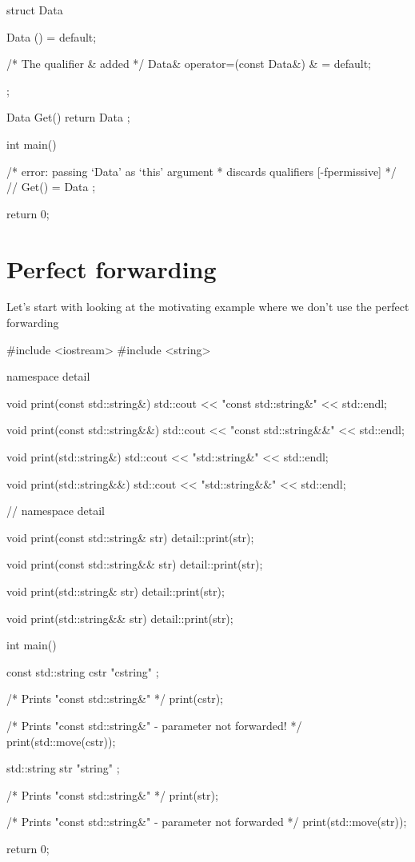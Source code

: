 \documentclass[../main]{subfiles}
\begin{document}
\begin{Code}
struct Data
{
    Data () = default;
    
    /* The qualifier & added */
    Data& operator=(const Data&) & = default;
};

Data Get()
{
    return Data {};
}

int main()
{
    /* error: passing ‘Data’ as ‘this’ argument
     * discards qualifiers [-fpermissive]
     */
    // Get() = Data {};

    return 0;
}
\end{Code}

\section{Perfect forwarding}
    Let's start with looking at the motivating example where we don't use the perfect forwarding
\begin{Code}
    #include <iostream>
    #include <string>
    
    namespace detail
    {
        void print(const std::string&)
        {
            std::cout << "const std::string&" << std::endl;
        }
        
        void print(const std::string&&)
        {
            std::cout << "const std::string&&" << std::endl;
        }
        
        void print(std::string&)
        {
            std::cout << "std::string&" << std::endl;
        }
        
        void print(std::string&&)
        {
            std::cout << "std::string&&" << std::endl;
        }
    }  // namespace detail
    
    void print(const std::string& str)
    {
        detail::print(str);
    }
    
    void print(const std::string&& str)
    {
        detail::print(str);
    }
    
    void print(std::string& str)
    {
        detail::print(str);
    }
    
    void print(std::string&& str)
    {
        detail::print(str);
    }
    
    int main()
    {
        const std::string cstr { "cstring" };
        
        /* Prints "const std::string&" */
        print(cstr);

        /* Prints "const std::string&" - parameter not forwarded! */
        print(std::move(cstr));
    
        std::string str { "string" };

        /* Prints "const std::string&" */
        print(str);

        /* Prints "const std::string&" - parameter not forwarded */
        print(std::move(str));
    
        return 0;
    }
\end{Code}
\end{document}
